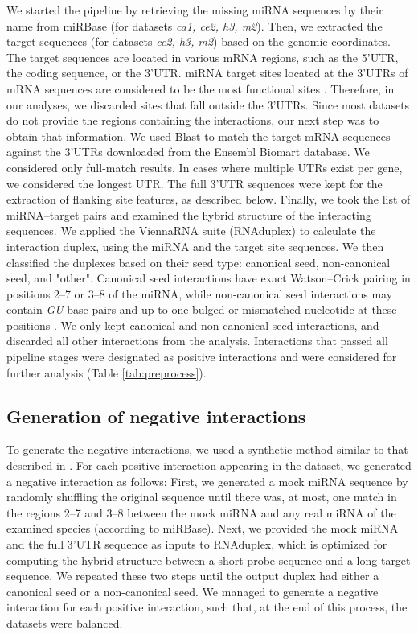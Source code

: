 \documentclass{bmcart}
\begin{document}
We started the pipeline by retrieving the missing miRNA sequences by their name from miRBase (for datasets  \textit{ca1, ce2, h3, m2}). Then, we extracted the target sequences (for datasets \textit{ce2, h3, m2}) based on the genomic coordinates. The target sequences are located in various mRNA regions, such as the 5'UTR, the coding sequence, or the 3'UTR. miRNA target sites located at the 3'UTRs of mRNA sequences are considered to be the most functional sites \cite{menor2014mirmark, baek2008impact}. Therefore, in our analyses, we discarded sites that fall outside the 3'UTRs. Since most datasets do not provide the regions containing the interactions, our next step was to obtain that information. We used Blast \cite{altschul1990basic_blast} to match the target mRNA sequences against the 3'UTRs downloaded from the Ensembl Biomart database. We considered only full-match results. In cases where multiple UTRs exist per gene, we considered the longest UTR. The full 3'UTR sequences were kept for the extraction of flanking site features, as described below. Finally, we took the list of miRNA--target pairs and examined the hybrid structure of the interacting sequences. We applied the ViennaRNA suite (RNAduplex) \cite{lorenz2011viennarna} to calculate the interaction duplex, using the miRNA and the target site sequences. We then classified the duplexes based on their seed type: canonical seed, non-canonical seed, and "other". Canonical seed interactions have exact Watson--Crick pairing in positions 2–7 or 3–8 of the miRNA, while non-canonical seed interactions may contain \textit{GU} base-pairs and up to one bulged or mismatched nucleotide at these positions \cite{helwak2013mapping}. We only kept canonical and non-canonical seed interactions, and discarded all other interactions from the analysis.
Interactions that passed all pipeline stages were designated as positive interactions and were considered for further analysis (Table \ref{tab:preprocess}).



\subsection*{Generation of negative interactions}
To generate the negative interactions, we used a synthetic method similar to that described in \cite{menor2014mirmark, john2004human, maragkakis2009accurate}. For each positive interaction appearing in the dataset, we generated a negative interaction as follows: First, we generated a mock miRNA sequence by randomly shuffling the original sequence until there was, at most, one match in the regions 2--7 and 3--8 between the mock miRNA and any real miRNA of the examined species (according to miRBase). Next, we provided the mock miRNA and the full 3'UTR sequence as inputs to RNAduplex, which is optimized for computing the hybrid structure between a short probe sequence and a long target sequence. We repeated these two steps until the output duplex had either a canonical seed or a non-canonical seed. 
We managed to generate a negative interaction for each positive interaction, such that, at the end of this process, the datasets were balanced.
\end{document}
